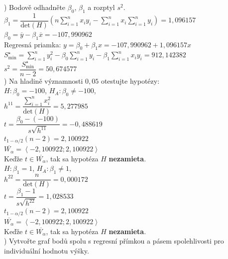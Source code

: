 \documentclass[pdftex, 11pt, a4paper, titlepage]{article}
\begin{document}
    ) Bodově odhadněte $\beta_0$, $\beta_1$ a rozptyl $s^2$.\\

    \noindent
    $\beta_1 = \dfrac{1}{\text{det}(H)} \left( n\sum\limits_{i=1}^{n}x_iy_i - \sum\limits_{i=1}^{n}x_i \sum\limits_{i=1}^{n}y_i \right) = 1,096157$\\
    $\beta_0 = \overline{y} - \beta_1\overline{x} = -107,990962$\\
    Regresná priamka: $y = \beta_0 + \beta_1x = -107,990962 + 1,096157x$\\
    $S^\star_\text{min} = \sum\limits_{i=1}^{n}y_i^2 - \beta_0\sum\limits_{i=1}^{n}y_i - \beta_1\sum\limits_{i=1}^{n}x_iy_i = 912,142382$\\
    $s^2 = \dfrac{S^\star_\text{min}}{n-2} = 50,674577$\\

    \newpage
    ) Na hladině významnosti $0,05$ otestujte hypotézy:\\
    
    $H : \beta_0 = -100$, $H_A : \beta_0 \neq -100$,\\
    $h^{11} = \dfrac{\sum\limits_{i=1}^{n}x_i^2}{\text{det}(H)} = 5,277985$\\
    $t = \dfrac{\beta_0 - (-100)}{s\sqrt{h^{11}}} = -0,488619$\\
    $t_{1-\alpha/2}(n-2) = 2,100922$\\
    $\overline{W_\alpha} = \left\langle -2,100922;2,100922  \right\rangle$\\
    Keďže $t\in\overline{W_\alpha}$, tak sa hypotéza $H$ \textbf{nezamieta}.\\

    $H : \beta_1 = 1$, $H_A : \beta_1 \neq 1$,\\
    $h^{22} = \dfrac{n}{\text{det}(H)} = 0,000172$\\
    $t = \dfrac{\beta_1 - 1}{s\sqrt{h^{22}}} = 1,028533$\\
    $t_{1-\alpha/2}(n-2) = 2,100922$\\
    $\overline{W_\alpha} = \left\langle -2,100922;2,100922  \right\rangle$\\
    Keďže $t\in\overline{W_\alpha}$, tak sa hypotéza $H$ \textbf{nezamieta}.\\

    ) Vytvořte graf bodů spolu s regresní přímkou a pásem spolehlivosti pro individuální hodnotu výšky.\\
\end{document}
